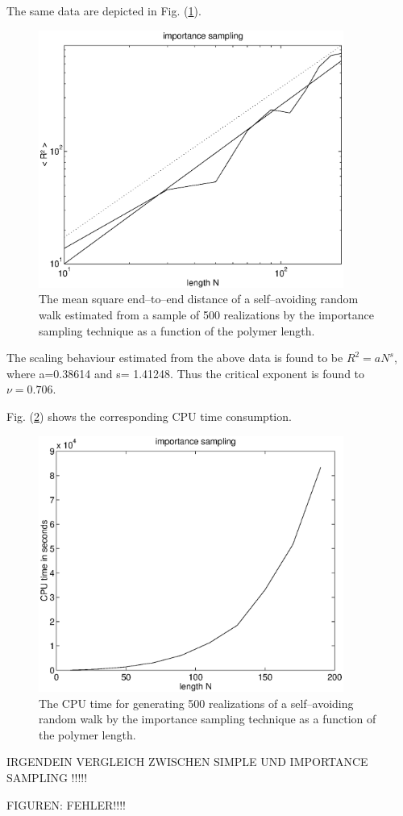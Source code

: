 The same data are depicted in Fig. (\ref{F_PLOTSAWLONG1}).
\begin{figure}
\label{F_PLOTSAWLONG1}
\includegraphics[width=10cm]{./Figures/f_plotsawlong1.eps}
\caption{The mean square end--to--end distance of a 
self--avoiding random walk estimated from a sample of 500
realizations by the importance sampling
technique as a function of the polymer length.}
\end{figure}
The scaling behaviour estimated from the above data is found to be
$R^2=aN^s$, where a=0.38614 and s= 1.41248. Thus the critical 
exponent is found to $\nu = 0.706$.

Fig. (\ref{F_PLOTSAWLONG2}) shows the corresponding CPU time 
consumption.
\begin{figure}
\label{F_PLOTSAWLONG2}
\includegraphics[width=10cm]{./Figures/f_plotsawlong2.eps}
\caption{The CPU time for generating 500 realizations  of a 
self--avoiding random walk  by the importance sampling
technique as a function of the polymer length.}
\end{figure}


IRGENDEIN VERGLEICH ZWISCHEN SIMPLE UND IMPORTANCE SAMPLING !!!!!


FIGUREN: FEHLER!!!!





